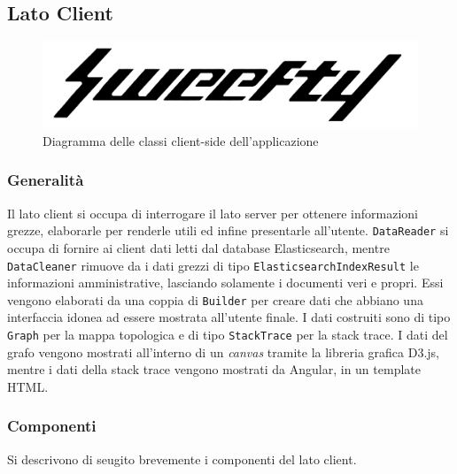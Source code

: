 
\subsection{Lato Client}



\begin{figure}[H]
    \centering
    \includegraphics[width=1\textwidth]{Images/logo.jpg}
    \caption{Diagramma delle classi client-side dell'applicazione}
    \label{img:diagrammaClassiClient}
\end{figure}

\subsubsection{Generalità}
Il lato client si occupa di interrogare il lato server per ottenere informazioni grezze, elaborarle per renderle utili ed infine presentarle all'utente. \texttt{DataReader} si occupa di fornire ai client dati letti dal database Elasticsearch, mentre \texttt{DataCleaner} rimuove da i dati grezzi di tipo \texttt{ElasticsearchIndexResult} le informazioni amministrative, lasciando solamente i documenti veri e propri. Essi vengono elaborati da una coppia di \texttt{Builder} per creare dati che abbiano una interfaccia idonea ad essere mostrata all'utente finale. I dati costruiti sono di tipo \texttt{Graph} per la mappa topologica e di tipo \texttt{StackTrace} per la stack trace. I dati del grafo vengono mostrati all'interno di un \emph{canvas} tramite la libreria grafica D3.js, mentre i dati della stack trace vengono mostrati da Angular, in un template HTML. 

\subsubsection{Componenti} 
\label{sec:Componenti}
Si descrivono di seugito brevemente i componenti del lato client.

